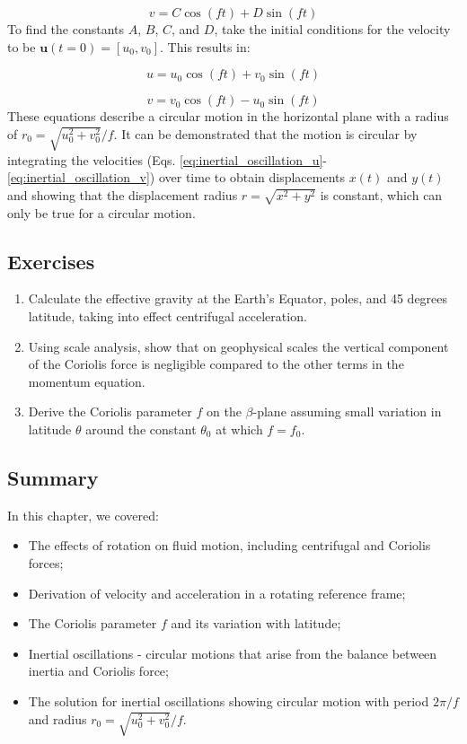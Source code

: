 \documentclass[12pt]{article}
\numberwithin{equation}{section}
\numberwithin{figure}{section}
\numberwithin{table}{section}
\begin{document}
\begin{equation}
  v = C \cos(f t) + D \sin(f t)
\end{equation}
To find the constants $A$, $B$, $C$, and $D$, take the initial conditions for
the velocity to be $\mathbf{u}(t=0) = [u_0, v_0]$.
This results in:

\begin{equation}
  u = u_0 \cos(f t) + v_0 \sin(f t)
  \label{eq:inertial_oscillation_u}
\end{equation}

\begin{equation}
  v = v_0 \cos(f t) - u_0 \sin(f t)
  \label{eq:inertial_oscillation_v}
\end{equation}
These equations describe a circular motion in the horizontal plane with a radius
of $r_0 = \sqrt{u_0^2 + v_0^2} / f$.
It can be demonstrated that the motion is circular by integrating the velocities
(Eqs. \ref{eq:inertial_oscillation_u}-\ref{eq:inertial_oscillation_v}) over time
to obtain displacements $x(t)$ and $y(t)$ and showing that the displacement
radius $r = \sqrt{x^2 + y^2}$ is constant, which can only be true for a circular
motion.

\subsection*{Exercises}

\begin{enumerate}
  \item Calculate the effective gravity at the Earth's Equator, poles, and 45 degrees
  latitude, taking into effect centrifugal acceleration.
  \item Using scale analysis, show that on geophysical scales the vertical
  component of the Coriolis force is negligible compared to the other terms
  in the momentum equation.
  \item Derive the Coriolis parameter $f$ on the $\beta$-plane assuming small
  variation in latitude $\theta$ around the constant $\theta_0$ at which $f = f_0$.
\end{enumerate}

\subsection*{Summary}

In this chapter, we covered:

\begin{itemize}
  \item The effects of rotation on fluid motion, including centrifugal and Coriolis
  forces;
  \item Derivation of velocity and acceleration in a rotating reference frame;
  \item The Coriolis parameter $f$ and its variation with latitude;
  \item Inertial oscillations - circular motions that arise from the balance between
  inertia and Coriolis force;
  \item The solution for inertial oscillations showing circular motion with period
  $2\pi/f$ and radius $r_0 = \sqrt{u_0^2 + v_0^2}/f$.
\end{itemize}
\end{document}
